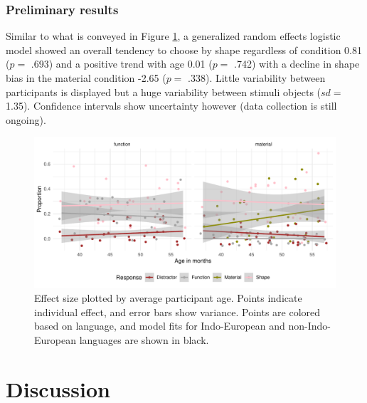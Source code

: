 \documentclass[10pt, letterpaper]{article}
\newenvironment{CodeChunk}{}{}
\begin{document}
\hypertarget{preliminary-results}{%
\subsubsection{Preliminary results}\label{preliminary-results}}

Similar to what is conveyed in Figure \ref{fig:jitter_function}, a
generalized random effects logistic model showed an overall tendency to
choose by shape regardless of condition 0.81 (\(p=\) .693) and a
positive trend with age 0.01 (\(p=\) .742) with a decline in shape bias
in the material condition -2.65 (\(p=\) .338). Little variability
between participants is displayed but a huge variability between stimuli
objects (\(sd=\) 1.35). Confidence intervals show uncertainty however
(data collection is still ongoing).

\begin{CodeChunk}
\begin{figure}[tb]
\includegraphics[width=1\linewidth]{figs/jitter_function-1} \caption[Effect size plotted by average participant age]{Effect size plotted by average participant age. Points indicate individual effect, and error bars show variance. Points are colored based on language, and model fits for Indo-European and non-Indo-European languages are shown in black.}\label{fig:jitter_function}
\end{figure}
\end{CodeChunk}

\hypertarget{discussion}{%
\section{Discussion}\label{discussion}}
\end{document}
